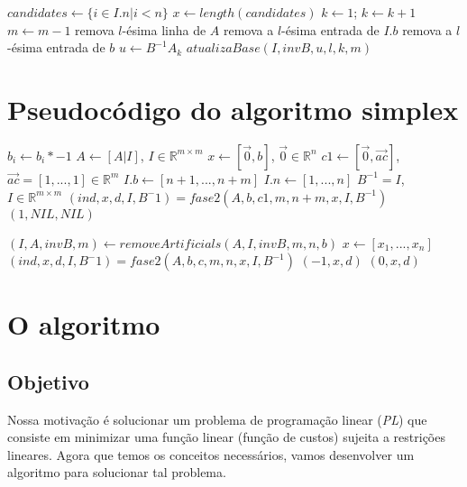 \documentclass[12pt]{article}
\begin{document}
\begin{algorithmic}
		\State $candidates \gets \{i \in I.n | i< n\}$
		\State $x \gets length(candidates)$
		\State $k \gets 1$;
			\State $k \gets k + 1$
		\EndWhile
			\State $m \gets m - 1$
			\State remova $l$-ésima linha de $A$
			\State remova a $l$-ésima entrada de $I.b$
			\State remova a $l$-ésima entrada de $b$
		\Else
			\State $u \gets B^{-1}A_k$ 
			\State $atualizaBase(I, invB, u, l, k, m)$
		\EndIf 
	\EndFor
\EndFunction
\end{algorithmic}
	
\section{Pseudocódigo do algoritmo simplex}
\begin{algorithmic}
		\State $b_i \gets b_i * -1$
	\EndFor
	\State $A \gets [A | I]$, $I \in \mathbb{R}^{m \times m}$
	\State $x \gets [\vec{0}, b]$, $\vec{0} \in \mathbb{R}^{n}$
	\State $c1 \gets [\vec{0}, \vec{ac}]$, $\vec{ac} = [1, ..., 1] \in \mathbb{R}^m$
	\State $I.b \gets [n + 1, ..., n + m]$
	\State $I.n \gets [1, ..., n]$
	\State $B^{-1} = I$, $I \in \mathbb{R}^{m \times m}$
	\State $(ind, x, d, I, B^-1) = fase2(A, b, c1, m, n + m, x, I, B^{-1})$
		\Return $(1, NIL, NIL)$
	
	\EndIf
	\State $(I, A, invB, m) \gets removeArtificials (A, I, invB, m, n, b)$
	\State $x \gets [x_1, ..., x_n]$
	\State $(ind, x, d, I, B^-1) = fase2(A, b, c, m, n, x, I, B^{-1})$
		\Return $(-1, x, d)$
	\Else
		\Return $(0, x, d)$
	\EndIf
\EndFunction
\end{algorithmic}

\section{O algoritmo}

\subsection{Objetivo}
	Nossa motivação é solucionar um problema de programação linear (\emph{PL}) que consiste em minimizar uma função linear (função de custos) sujeita a restrições lineares. Agora que temos os conceitos necessários, vamos desenvolver um algoritmo para solucionar tal problema.
\end{document}
